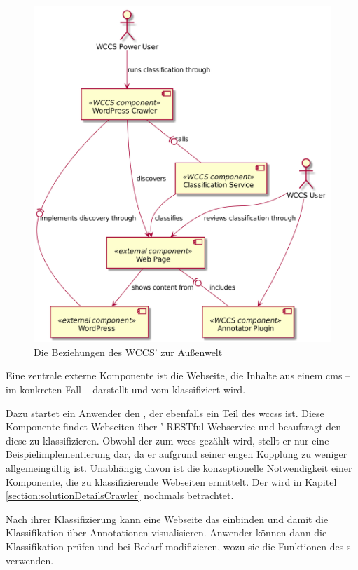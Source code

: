         \begin{figure}
            \centering
            \includegraphics[scale=\imageScalingFactor]{../resources/architecture/external_architecture.png}
            \caption{Die Beziehungen des WCCS' zur Außenwelt}
            \label{image:wccsExternalArchitecture}
        \end{figure}

        Eine zentrale externe Komponente ist die Webseite,
        die Inhalte aus einem \gls{cms} -- im konkreten Fall {\wordpress} --
        darstellt und vom {\classificationService} klassifiziert wird.
        
        Dazu startet ein Anwender den {\wordpressCrawler}, der ebenfalls ein Teil des \glspl{wccs} ist.
        Diese Komponente findet Webseiten über {\wordpress}' RESTful Webservice und beauftragt den
        {\classificationService} diese zu klassifizieren.
        Obwohl der {\wordpressCrawler} zum \gls{wccs} gezählt wird,
        stellt er nur eine Beispielimplementierung dar,
        da er aufgrund seiner engen Kopplung zu {\wordpress} weniger allgemeingültig ist.
        Unabhängig davon ist die konzeptionelle Notwendigkeit einer Komponente,
        die zu klassifizierende Webseiten ermittelt.
        Der {\wordpressCrawler} wird in Kapitel \ref{section:solutionDetailsCrawler} nochmals betrachtet.

        Nach ihrer Klassifizierung kann eine Webseite das {\annotatorPlugin} einbinden
        und damit die Klassifikation über Annotationen visualisieren.
        Anwender können dann die Klassifikation prüfen und bei Bedarf modifizieren,
        wozu sie die Funktionen des {\annotatorPlugin}s verwenden.
